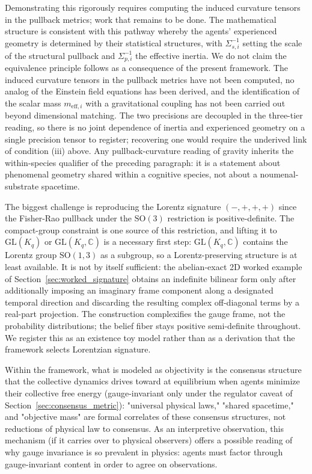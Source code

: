 \documentclass[11pt]{article}
\begin{document}
Demonstrating this rigorously requires computing the induced curvature tensors in the pullback metrics; work that remains to be done. The mathematical structure is consistent with this pathway whereby the agents' experienced geometry is determined by their statistical structures, with $\Sigma_{s,i}^{-1}$ setting the scale of the structural pullback and $\Sigma_{p,i}^{-1}$ the effective inertia. We do not claim the equivalence principle follows as a consequence of the present framework. The induced curvature tensors in the pullback metrics have not been computed, no analog of the Einstein field equations has been derived, and the identification of the scalar mass $m_{\text{eff},i}$ with a gravitational coupling has not been carried out beyond dimensional matching. The two precisions are decoupled in the three-tier reading, so there is no joint dependence of inertia and experienced geometry on a single precision tensor to register; recovering one would require the underived link of condition (iii) above. Any pullback-curvature reading of gravity inherits the within-species qualifier of the preceding paragraph: it is a statement about phenomenal geometry shared within a cognitive species, not about a noumenal-substrate spacetime.

The biggest challenge is reproducing the Lorentz signature $(-,+,+,+)$ since the Fisher-Rao pullback under the $\mathrm{SO}(3)$ restriction is positive-definite. The compact-group constraint is one source of this restriction, and lifting it to $\mathrm{GL}(K_q)$ or $\mathrm{GL}(K_q, \mathbb{C})$ is a necessary first step: $\mathrm{GL}(K_q, \mathbb{C})$ contains the Lorentz group $\mathrm{SO}(1,3)$ as a subgroup, so a Lorentz-preserving structure is at least available. It is not by itself sufficient: the abelian-exact 2D worked example of Section~\ref{sec:worked_signature} obtains an indefinite bilinear form only after additionally imposing an imaginary frame component along a designated temporal direction and discarding the resulting complex off-diagonal terms by a real-part projection. The construction complexifies the gauge frame, not the probability distributions; the belief fiber stays positive semi-definite throughout. We register this as an existence toy model rather than as a derivation that the framework selects Lorentzian signature.

Within the framework, what is modeled as objectivity is the consensus structure that the collective dynamics drives toward at equilibrium when agents minimize their collective free energy (gauge-invariant only under the regulator caveat of Section~\ref{sec:consensus_metric}): "universal physical laws," "shared spacetime," and "objective mass" are formal correlates of these consensus structures, not reductions of physical law to consensus. As an interpretive observation, this mechanism (if it carries over to physical observers) offers a possible reading of why gauge invariance is so prevalent in physics: agents must factor through gauge-invariant content in order to agree on observations.
\end{document}
